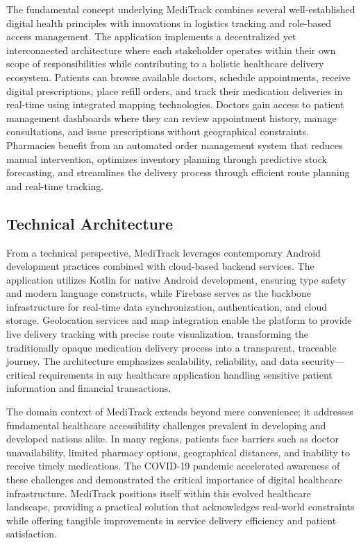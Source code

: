 \documentclass[12pt,a4paper]{report}
\begin{document}
The fundamental concept underlying MediTrack combines several well-established digital health principles with innovations in logistics tracking and role-based access management. The application implements a decentralized yet interconnected architecture where each stakeholder operates within their own scope of responsibilities while contributing to a holistic healthcare delivery ecosystem. Patients can browse available doctors, schedule appointments, receive digital prescriptions, place refill orders, and track their medication deliveries in real-time using integrated mapping technologies. Doctors gain access to patient management dashboards where they can review appointment history, manage consultations, and issue prescriptions without geographical constraints. Pharmacies benefit from an automated order management system that reduces manual intervention, optimizes inventory planning through predictive stock forecasting, and streamlines the delivery process through efficient route planning and real-time tracking.

\subsection{Technical Architecture}

From a technical perspective, MediTrack leverages contemporary Android development practices combined with cloud-based backend services. The application utilizes Kotlin for native Android development, ensuring type safety and modern language constructs, while Firebase serves as the backbone infrastructure for real-time data synchronization, authentication, and cloud storage. Geolocation services and map integration enable the platform to provide live delivery tracking with precise route visualization, transforming the traditionally opaque medication delivery process into a transparent, traceable journey. The architecture emphasizes scalability, reliability, and data security---critical requirements in any healthcare application handling sensitive patient information and financial transactions.

The domain context of MediTrack extends beyond mere convenience; it addresses fundamental healthcare accessibility challenges prevalent in developing and developed nations alike. In many regions, patients face barriers such as doctor unavailability, limited pharmacy options, geographical distances, and inability to receive timely medications. The COVID-19 pandemic accelerated awareness of these challenges and demonstrated the critical importance of digital healthcare infrastructure. MediTrack positions itself within this evolved healthcare landscape, providing a practical solution that acknowledges real-world constraints while offering tangible improvements in service delivery efficiency and patient satisfaction.
\end{document}
